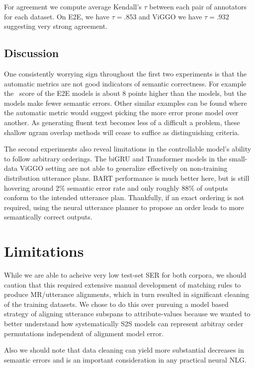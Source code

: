 For agreement we compute average Kendall's $\tau$ between each pair of
annotators for each dataset. On E2E, we have $\tau=.853$ and ViGGO we have
$\tau=.932$ suggesting very strong agreement.

\subsection{Discussion}

One consistently worrying sign throughout the first two experiments is that the
automatic metrics are not good indicators of semantic correctness.  For
example the \rougel~score of the E2E  models is about 8
points higher than the  models, but the 
models make fewer semantic errors. Other similar examples can be found where
the automatic metric would suggest picking the more error prone model over
another. As generating fluent text becomes less of a difficult a problem,
these shallow ngram overlap methods will cease to suffice as distinguishing
criteria.

The second experiments also reveal limitations in the controllable model's
ability to follow arbitrary orderings. The biGRU and Transformer models in the
small-data ViGGO setting are not able to generalize effectively on
non-training distribution utterance plans. BART performance is much
better here, but is still hovering around 2\% semantic error rate and only roughly 88\% of
outputs conform to the intended utterance plan.  Thankfully, if an exact
ordering is not required, using the neural utterance planner to propose an order leads to more
semantically correct outputs.


\section{Limitations}

While we are able to acheive very low test-set SER for both corpora, we 
should caution that this required extensive manual development of matching 
rules to produce MR/utterance alignments, which in turn resulted in 
significant cleaning of the training datasets. We chose to do this over 
pursuing a model based strategy of aligning utterance subspans to 
attribute-values %
because we wanted to better understand how systematically S2S models can
represent arbitray order permutations independent of alignment model error. 


Also we should note that 
data cleaning can yield more substantial decreases in
semantic errors \cite{dusek2019,hongminwang2019} and is an important 
consideration in any practical neural NLG.

